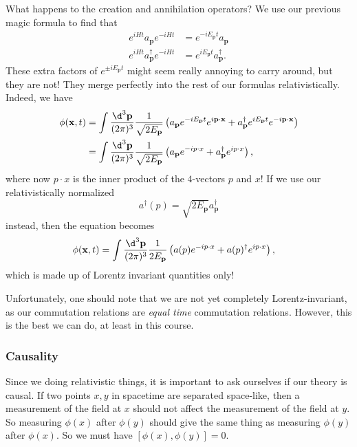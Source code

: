 \documentclass[a4paper]{article}
\begin{document}
What happens to the creation and annihilation operators? We use our previous magic formula to find that
\begin{align*}
  e^{iHt}a_\mathbf{p} e^{-iHt} &= e^{-iE_\mathbf{p} t} a_\mathbf{p}\\
  e^{iHt} a_\mathbf{p}^\dagger e^{-iHt} &= e^{iE_\mathbf{p} t} a_\mathbf{p}^\dagger.
\end{align*}
These extra factors of $e^{\pm iE_\mathbf{p} t}$ might seem really annoying to carry around, but they are not! They merge perfectly into the rest of our formulas relativistically. Indeed, we have
\begin{align*}
  \phi(\mathbf{x}, t) &= \int \frac{\d^3 \mathbf{p}}{(2\pi)^3}\frac{1}{\sqrt{2 E_\mathbf{p}}} \left(a_\mathbf{p}e^{-iE_\mathbf{p} t} e^{i\mathbf{p}\cdot \mathbf{x}} + a_\mathbf{p}^\dagger e^{iE_\mathbf{p} t} e^{-i\mathbf{p}\cdot \mathbf{x}}\right)\\
  &= \int \frac{\d^3 \mathbf{p}}{(2\pi)^3}\frac{1}{\sqrt{2 E_\mathbf{p}}} \left(a_\mathbf{p} e^{-ip \cdot x} + a_\mathbf{p}^\dagger e^{i p \cdot x}\right),
\end{align*}
where now $p \cdot x$ is the inner product of the $4$-vectors $p$ and $x$! If we use our relativistically normalized
\[
  a^\dagger(p) = \sqrt{2 E_\mathbf{p}} a_\mathbf{p}^\dagger
\]
instead, then the equation becomes
\begin{align*}
  \phi(\mathbf{x}, t) &= \int \frac{\d^3 \mathbf{p}}{(2\pi)^3} \frac{1}{2E_\mathbf{p}}\left(a(p) e^{-ip \cdot x} + a(p)^\dagger e^{i p \cdot x}\right),
\end{align*}
which is made up of Lorentz invariant quantities only!

Unfortunately, one should note that we are not yet completely Lorentz-invariant, as our commutation relations are \emph{equal time} commutation relations. However, this is the best we can do, at least in this course.

\subsubsection*{Causality}
Since we doing relativistic things, it is important to ask ourselves if our theory is causal. If two points $x, y$ in spacetime are separated space-like, then a measurement of the field at $x$ should not affect the measurement of the field at $y$. So measuring $\phi(x)$ after $\phi(y)$ should give the same thing as measuring $\phi(y)$ after $\phi(x)$. So we must have $[\phi(x), \phi(y)] = 0$.
\end{document}
